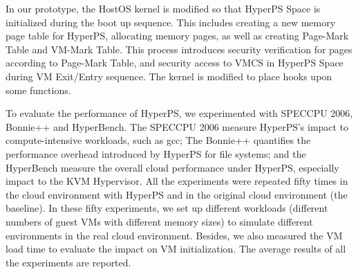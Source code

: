 In our prototype, the HostOS kernel is modified so that HyperPS Space is initialized during the boot up sequence. This includes creating a new memory page table for HyperPS, allocating memory pages, as well as creating Page-Mark Table and VM-Mark Table. This process introduces security verification for pages according to Page-Mark Table, and security access to VMCS in HyperPS Space during VM Exit/Entry sequence.
The kernel is modified to place hooks upon some functions.

To evaluate the performance of HyperPS, we experimented with SPECCPU 2006, Bonnie++ and HyperBench\cite{wei2019hyperbench}. The SPECCPU 2006 measure HyperPS's impact to compute-intensive workloads, such as gcc; The Bonnie++ quantifies the performance overhead introduced by HyperPS for file systems; and the HyperBench measure the overall cloud performance under HyperPS, especially impact to the KVM Hypervisor.
All the experiments were repeated fifty times in the cloud environment with HyperPS and in the original cloud environment (the baseline).
In these fifty experiments, we set up different workloads (different numbers of guest VMs with different memory sizes) to simulate different environments in the real cloud environment. 
Besides, we also measured the VM load time to evaluate the impact on VM initialization.
The average results of all the experiments are reported. 






